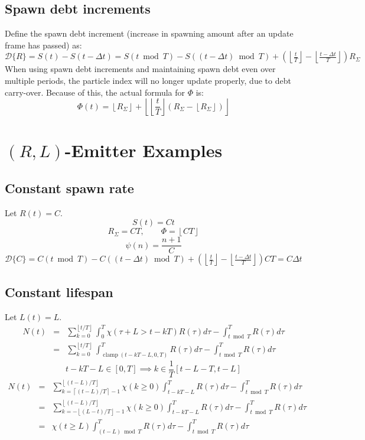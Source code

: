 \documentclass[10pt]{report}
\newcommand{\floor}[1]{\left\lfloor #1 \right\rfloor}
\newcommand{\ceil}[1]{\left\lceil #1 \right\rceil}
\DeclareMathOperator{\clamp}{clamp}
\begin{document}
\subsection{Spawn debt increments}
Define the spawn debt increment (increase in spawning amount after an update frame has passed) as:
\begin{equation}\mathcal{D}\{R\}=S(t)-S(t-\Delta t)=S(t\bmod T)-S((t-\Delta t)\bmod T)+(\floor{\tfrac{t}{T}}-\floor{\tfrac{t-\Delta t}{T}})R_\Sigma\end{equation}
When using spawn debt increments and maintaining spawn debt even over multiple periods, the particle index will no longer update properly, due to debt carry-over. Because of this, the actual formula for $\Phi$ is:
\begin{equation}\boxed{\Phi(t)=\floor{R_\Sigma}+\floor{\floor{\frac{t}{T}}(R_\Sigma-\floor{R_\Sigma})}}\end{equation}

\section{$(R,L)$-Emitter Examples}

\subsection{Constant spawn rate}
Let $R(t)=C$.
\begin{equation}S(t)=Ct\end{equation}
\begin{equation}R_\Sigma=CT,\qquad\Phi=\floor{CT}\end{equation}
\begin{equation}\psi(n)=\frac{n+1}{C}\end{equation}
\begin{equation}\mathcal{D}\{C\}=C(t\bmod T)-C((t-\Delta t)\bmod T)+(\floor{\tfrac{t}{T}}-\floor{\tfrac{t-\Delta t}{T}})CT=C\Delta t\end{equation}

\subsection{Constant lifespan}
Let $L(t)=L$.
\begin{eqnarray}
N(t)&=&\sum_{k=0}^{\floor{t/T}}\int_0^T\chi(\tau+L>t-kT)R(\tau)d\tau-\int_{t\bmod T}^TR(\tau)d\tau\\
&=&\sum_{k=0}^{\floor{t/T}}\int_{\clamp(t-kT-L,0,T)}^TR(\tau)d\tau-\int_{t\bmod T}^TR(\tau)d\tau
\end{eqnarray}
$$t-kT-L\in[0,T]\implies k\in\frac{1}{T}[t-L-T,t-L]$$
\begin{eqnarray}
N(t)&=&\sum_{k=\ceil{(t-L)/T}-1}^{\floor{(t-L)/T}}\chi(k\geq0)\int_{t-kT-L}^TR(\tau)d\tau-\int_{t\bmod T}^TR(\tau)d\tau\\
&=&\sum_{k=-\floor{(L-t)/T}-1}^{\floor{(t-L)/T}}\chi(k\geq0)\int_{t-kT-L}^TR(\tau)d\tau-\int_{t\bmod T}^TR(\tau)d\tau\\
&=&\chi(t\geq L)\int_{(t-L)\bmod T}^TR(\tau)d\tau-\int_{t\bmod T}^TR(\tau)d\tau
\end{eqnarray}
\end{document}

